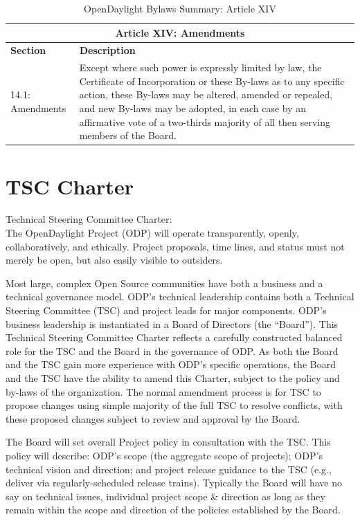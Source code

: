 \documentclass[a4paper, 12pt]{book}
\begin{document}
\begin{table}[H]
  \begin{center}
    \begin{tabular}{ | p{3cm} | p{12cm} | }
    \toprule
    \multicolumn {2}{|c|}{\textbf{Article XIV: Amendments}} \\
    \hline
    \textbf{Section} & \textbf{Description} \\
    \hline
    14.1: Amendments & Except where such power is expressly limited by law, the Certificate of Incorporation or these By-laws as to any specific action, these By-laws may be altered, amended or repealed, and new By-laws may be adopted, in each case by an affirmative vote of a two-thirds majority of all then serving members of the Board.\\
    \bottomrule
    \end{tabular}
    \caption{OpenDaylight Bylaws Summary: Article XIV}
    \label{tab:odlbylaws-art14}
  \end{center}
\end{table}

\chapter{TSC Charter}
\label{chap:appendix_tsccharter}
Technical Steering Committee Charter:\\
The OpenDaylight Project (ODP) will operate transparently, openly, collaboratively, and ethically.  Project proposals, time lines, and status must not merely be open, but also easily visible to outsiders.

Most large, complex Open Source communities have both a business and a technical governance model.  ODP's technical leadership contains both a Technical Steering Committee (TSC) and project leads for major components.  ODP's business leadership is instantiated in a Board of Directors (the “Board”).  This Technical Steering Committee Charter reflects a carefully constructed balanced role for the TSC and the Board in the governance of ODP.  As both the Board and the TSC gain more experience with ODP’s specific operations, the Board and the TSC have the ability to amend this Charter, subject to the policy and by-laws of the organization.  The normal amendment process is for TSC to propose changes using simple majority of the full TSC to resolve conflicts, with these proposed changes subject to review and approval by the Board.

The Board will set overall Project policy in consultation with the TSC.   This policy will describe:  ODP's scope (the aggregate scope of projects); ODP’s technical vision and direction; and project release guidance to the TSC (e.g., deliver via regularly-scheduled release trains).   Typically the Board will have no say on technical issues, individual project scope \& direction as long as they remain within the scope and direction of the policies established by the Board.
\end{document}
